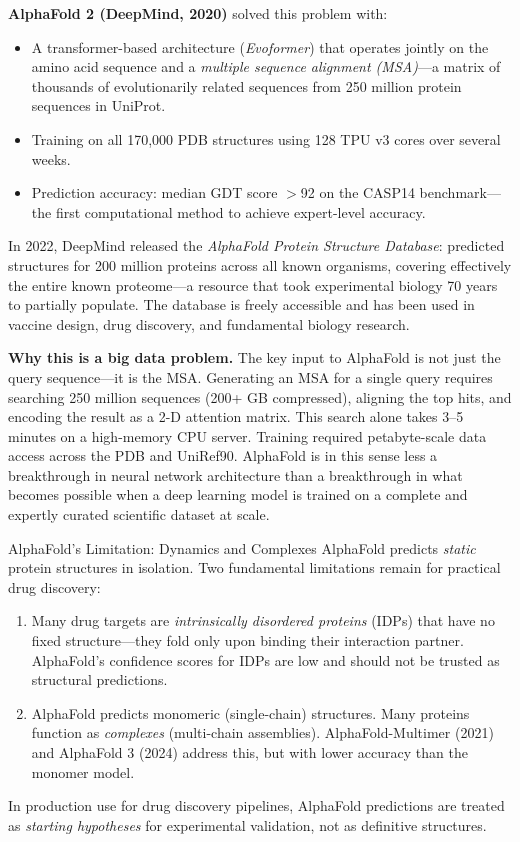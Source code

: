 \textbf{AlphaFold 2 (DeepMind, 2020)} solved this problem with:
\begin{itemize}
  \item A transformer-based architecture (\emph{Evoformer}) that operates
        jointly on the amino acid sequence and a \emph{multiple sequence
        alignment (MSA)}---a matrix of thousands of evolutionarily related
        sequences from 250 million protein sequences in UniProt.
  \item Training on all 170{,}000 PDB structures using 128 TPU v3 cores
        over several weeks.
  \item Prediction accuracy: median GDT score $>$92 on the CASP14
        benchmark---the first computational method to achieve expert-level
        accuracy.
\end{itemize}

In 2022, DeepMind released the \emph{AlphaFold Protein Structure Database}:
predicted structures for 200 million proteins across all known organisms,
covering effectively the entire known proteome---a resource that took
experimental biology 70 years to partially populate. The database is
freely accessible and has been used in vaccine design, drug discovery, and
fundamental biology research.

\textbf{Why this is a big data problem.} The key input to AlphaFold
is not just the query sequence---it is the MSA. Generating an MSA for
a single query requires searching 250 million sequences (200+ GB compressed),
aligning the top hits, and encoding the result as a 2-D attention matrix.
This search alone takes 3--5 minutes on a high-memory CPU server. Training
required petabyte-scale data access across the PDB and UniRef90. AlphaFold
is in this sense less a breakthrough in neural network architecture than
a breakthrough in what becomes possible when a deep learning model is
trained on a complete and expertly curated scientific dataset at scale.

\begin{techdebt}{AlphaFold's Limitation: Dynamics and Complexes}
AlphaFold predicts \emph{static} protein structures in isolation.
Two fundamental limitations remain for practical drug discovery:
\begin{enumerate}
  \item Many drug targets are \emph{intrinsically disordered proteins}
        (IDPs) that have no fixed structure---they fold only upon binding
        their interaction partner. AlphaFold's confidence scores for IDPs
        are low and should not be trusted as structural predictions.
  \item AlphaFold predicts monomeric (single-chain) structures.
        Many proteins function as \emph{complexes} (multi-chain assemblies).
        AlphaFold-Multimer (2021) and AlphaFold 3 (2024) address this,
        but with lower accuracy than the monomer model.
\end{enumerate}
In production use for drug discovery pipelines, AlphaFold predictions
are treated as \emph{starting hypotheses} for experimental validation,
not as definitive structures.
\end{techdebt}


